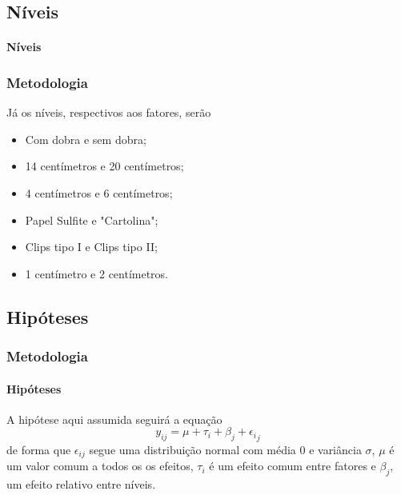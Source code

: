 \documentclass{beamer}
\begin{document}
    \subsection{Níveis}
            \begin{frame}
                \framesubtitle{Níveis}
                    \frametitle{Metodologia}

                        Já os níveis, respectivos aos fatores, serão
                            \begin{itemize}
                                \item Com dobra e sem dobra;
                                \item 14 centímetros e 20 centímetros;
                                \item 4 centímetros e 6 centímetros;
                                \item Papel Sulfite e "Cartolina";
                                \item Clips tipo I e Clips tipo II;
                                \item 1 centímetro e 2 centímetros.
                            \end{itemize}
        \end{frame}

    \subsection{Hipóteses}
         \begin{frame}
            \frametitle{Metodologia}
               \framesubtitle{Hipóteses}
                  A hipótese aqui assumida seguirá a equação
                     \begin{equation}
                        y_{ij}= \mu + \tau_i + \beta_j + {\epsilon_i}_j
                        \label{eq:equacao definidora}
                     \end{equation}
                  de forma que \large{$\epsilon_{ij}$} segue uma distribuição normal com média 0 e variância $\sigma$, $\mu$ é um valor comum a todos os os efeitos, $\tau_i$ é um efeito comum entre fatores e $\beta_j$, um efeito relativo entre níveis.
         \end{frame}
\end{document}
